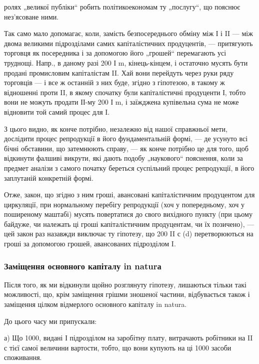 \parcont{}  %
ролях „великої публіки“ робить політикоекономам ту „послугу“, що
пояснює нез’ясоване ними.

Так само мало допомагає, коли, замість безпосереднього обміну між
І і II — між двома великими підрозділами самих капіталістичних продуцентів,
— притягують торговця як посередника і за допомогою його „грошей“
перемагають усі труднощі. Напр., в даному разі 200 І m, кінець-кінцем,
і остаточно мусять бути продані промисловим капіталістам II. Хай вони
перейдуть через руки ряду торговців — і все ж останній з них буде, згідно
з гіпотезою, в такому ж відношенні проти II, в якому спочатку були
капіталістичні продуценти І, тобто вони не можуть продати ІІ-му 200 І m,
і заїжджена купівельна сума не може відновити той самий процес для I.

З цього видно, як конче потрібно, незалежно від нашої справжньої
мети, дослідити процес репродукції в його фундаментальній формі, —
де усунуто всі бічні обставини, що затемнюють справу, — як конче
потрібно це для того, щоб відкинути фалшиві викрути, які дають подобу
„наукового“ пояснення, коли за предмет аналізи з самого початку
береться суспільний процес репродукції, в його заплутаній конкретній
формі.

Отже, закон, що згідно з ним гроші, авансовані капіталістичним продуцентом
для циркуляції, при нормальному перебігу репродукції (хоч у
попередньому, хоч у поширеному маштабі) мусять повертатися до свого
вихідного пункту (при цьому байдуже, чи належать ці гроші капіталістичним
продуцентам, чи їх позичено), — цей закон раз назавжди виключає
ту гіпотезу, що 200 II с (d) перетворюються на гроші за допомогою
грошей, авансованих підрозділом I.

\subsubsection{Заміщення основного капіталу in naturа}

Після того, як ми відкинули щойно розглянуту гіпотезу, лишаються
тільки такі можливості, що, крім заміщення грішми зношеної частини, відбувається
також і заміщення цілком відмерлого основного капіталу in natura.

До цього часу ми припускали:

а) Що 1000, видані І підрозділом на заробітну плату, витрачають
робітники на II с тієї самої величини вартости, тобто, що вони
купують на ці 1000 засоби споживання.

